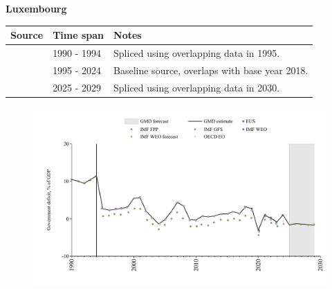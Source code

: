 \documentclass[12pt,a4paper,landscape]{article}
\begin{document}
\begin{adjustbox}{max totalsize={\paperwidth}{\paperheight},center}
\begin{minipage}[t][\textheight][t]{\textwidth}
\vspace*{0.5cm}
{}
\begin{center}
{\Large\bfseries Luxembourg}
\end{center}
\vspace{0.5cm}
\begin{table}[H]
\centering
\small
\begin{tabular}{|l|l|l|}
\hline
\textbf{Source} & \textbf{Time span} & \textbf{Notes} \\
\hline
\rowcolor{white}\cite{IMF_GFS}& 1990 - 1994 &Spliced using overlapping data in 1995.\\
\rowcolor{lightgray}\cite{EUS}& 1995 - 2024 &Baseline source, overlaps with base year 2018.\\
\rowcolor{white}\cite{IMF_WEO_forecast}& 2025 - 2029 &Spliced using overlapping data in 2030.\\
\hline
\end{tabular}
\end{table}
\begin{figure}[H]
\centering
\includegraphics[width=\textwidth,height=0.6\textheight,keepaspectratio]{graphs/LUX_govdef_GDP.pdf}
\end{figure}
\end{minipage}
\end{adjustbox}
\end{document}
